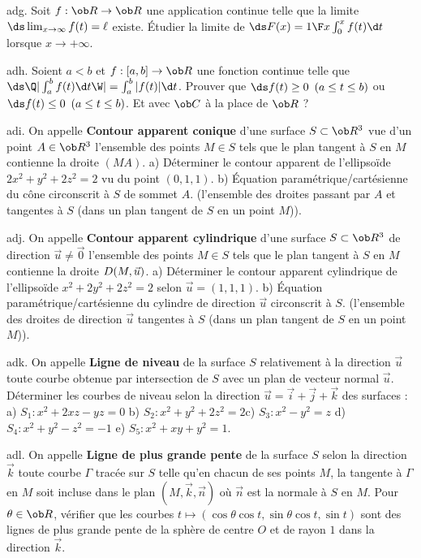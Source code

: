 \exo [Level=2,Fight=1,Learn=1,Field=\FonctionsDéfiniesParUneIntégrale,Type=\Exercices,Origin=] adg. 
Soit $f:\ob R\to\ob R$ une application continue telle que la limite $\ds \lim_{x\to\infty}f(t)=\ell$ existe. \pn 
\'Etudier la limite de $\ds F(x)={1\F x}\int_0^xf(t)\d t$ lorsque $x\to+\infty$. 
 
\exo [Level=2,Fight=2,Learn=2,Field=\Intégrales,Type=\Exercices,Origin=\MP] adh. 
Soient $a<b$ et $f:[a,b]\to\ob R$ une fonction continue telle que $\ds\Q|\int_a^bf(t)\d t\W|=\int_a^b|f(t)|\d t$. \pn
Prouver que $\ds f(t)\ge0\ \,(a\le t\le b)$ ou $\ds f(t)\le 0\ \,(a\le t\le b)$.  Et avec $\ob C$ à la place de $\ob R$ ?

\exo [Level=2,Fight=3,Learn=2,Field=\Surfaces,Type=\Exercices,Origin=\MP] adi.  
On appelle {\bf Contour apparent conique} d'une surface $S\subset\ob R^3$ 
vue d'un point $A\in\ob R^3$ l'ensemble des points $M\in S$ tels que le plan tangent à $S$ en $M$ contienne la droite $(MA)$. \pn
a) Déterminer le contour apparent de l'ellipsoïde $2x^2+y^2+2z^2=2$ vu du point $(0,1,1)$. \smallskip\noindent
b) \'Equation paramétrique/cartésienne du cône circonscrit à $S$ de sommet $A$. (l'ensemble des droites passant par $A$ et tangentes à $S$ 
(dans un plan tangent de $S$ en un point $M$)). 

\exo [Level=2,Fight=3,Learn=2,Field=\Surfaces,Type=\Exercices,Origin=\MP] adj. 
On appelle  {\bf Contour apparent cylindrique} d'une surface $S\subset\ob R^3$ 
de direction $\vec u\neq\vec 0$ l'ensemble des points $M\in S$ tels que le plan tangent à $S$ en $M$ 
contienne la droite $\sc D(M,\vec u)$. \smallskip\noindent
a) Déterminer le contour apparent cylindrique de l'ellipsoïde $x^2+2y^2+2z^2=2$ 
selon $\vec u=(1,1,1)$. \pn
b) \'Equation paramétrique/cartésienne du cylindre de direction $\vec u$ 
circonscrit à $S$. (l'ensemble des droites de direction  $\vec u$ tangentes à $S$ 
(dans un plan tangent de $S$ en un point $M$)). 

\exo [Level=2,Fight=3,Learn=2,Field=\Surfaces,Type=\Exercices,Origin=\MP] adk. 
On appelle {\bf Ligne de niveau} de la surface $S$ relativement à la direction $\vec u$ 
toute courbe obtenue par intersection de $S$ avec un plan de vecteur normal $\vec u$. \pn
Déterminer les courbes de niveau selon la direction $\vec u=\vec i+\vec j+\vec k$ des surfaces : \pn
a)  $S_1: x^2+2xz-yz=0$ \qquad b) $S_2:x^2+y^2+2z^2=2$\qquad c) $S_3: x^2-y^2=z$ \pn
d) $S_4:x^2+y^2-z^2=-1$ \qquad e) $S_5:x^2+xy+y^2=1$.

\exo [Level=2,Fight=3,Learn=2,Field=\Surfaces,Type=\Exercices,Origin=\MP] adl. 
On appelle {\bf Ligne de plus grande pente} de la surface $S$ selon la direction $\vec k$ 
toute courbe $\Gamma$ tracée sur $S$ telle qu'en chacun de ses points $M$, la tangente à $\Gamma$ en $M$ soit incluse dans le plan $(M,\vec k, \vec n)$ 
où $\vec n$ est la normale à $S$ en $M$. \pn
Pour $\theta\in\ob R$, vérifier que les courbes $t\mapsto(\cos\theta\cos t,\sin\theta\cos t,\sin t)$ 
sont des lignes de plus grande pente  de la sphère de centre $O$ et de rayon $1$ dans la direction $\vec k$. 


